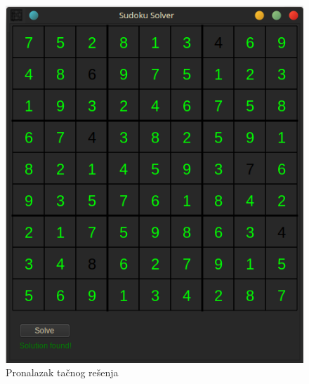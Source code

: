 \documentclass[a4paper]{article}
\begin{document}
{\begin{figure}[h!]
  \centering
  \begin{minipage}{0.45\textwidth}
      \centering
      \includegraphics[width=\linewidth]{slike/app_solve.png}
      \caption{Pronalazak tačnog rešenja}
      \label{fig:app_solve}
  \end{minipage}\hfill
  \begin{minipage}{0.45\textwidth}
      \centering

\end{minipage}
\end{figure}}
\end{document}
